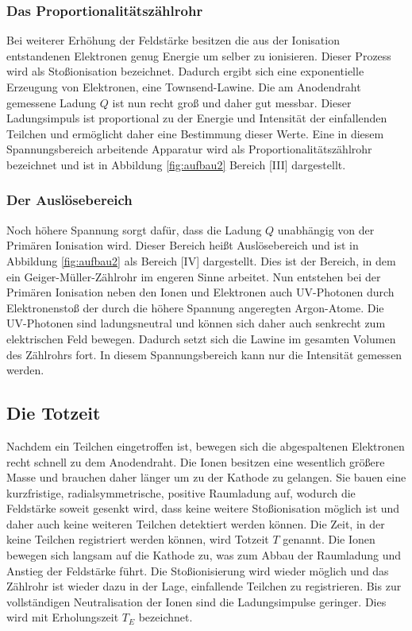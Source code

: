     \subsubsection{Das Proportionalitätszählrohr}
      Bei weiterer Erhöhung der Feldstärke besitzen die aus der Ionisation entstandenen Elektronen
      genug Energie um selber zu ionisieren. Dieser Prozess wird als Stoßionisation bezeichnet.
      Dadurch ergibt sich eine exponentielle Erzeugung von Elektronen, eine Townsend-Lawine. Die am
      Anodendraht gemessene Ladung $Q$ ist nun recht groß und daher gut messbar. Dieser Ladungsimpuls
      ist proportional zu der Energie und Intensität der einfallenden Teilchen und ermöglicht daher
      eine Bestimmung dieser Werte. Eine in diesem Spannungsbereich arbeitende Apparatur wird als
      Proportionalitätszählrohr bezeichnet und ist in Abbildung \ref{fig:aufbau2} Bereich [III]
      dargestellt.
    \subsubsection{Der Auslösebereich}
      Noch höhere Spannung sorgt dafür, dass die Ladung $Q$ unabhängig von der Primären Ionisation
      wird. Dieser Bereich heißt Auslösebereich und ist in Abbildung \ref{fig:aufbau2} als Bereich
      [IV] dargestellt. Dies ist der Bereich, in dem ein Geiger-Müller-Zählrohr im engeren Sinne
      arbeitet. Nun entstehen bei der Primären Ionisation neben den Ionen und Elektronen auch
      UV-Photonen durch Elektronenstoß der durch die höhere Spannung angeregten Argon-Atome. Die
      UV-Photonen sind ladungsneutral und können sich daher auch senkrecht zum elektrischen Feld
      bewegen. Dadurch setzt sich die Lawine im gesamten Volumen des Zählrohrs fort. In diesem
      Spannungsbereich kann nur die Intensität gemessen werden.
  \subsection{Die Totzeit}
    Nachdem ein Teilchen eingetroffen ist, bewegen sich die abgespaltenen Elektronen recht schnell zu
    dem Anodendraht. Die Ionen besitzen eine wesentlich größere Masse und brauchen daher länger um zu
    der Kathode zu gelangen. Sie bauen eine kurzfristige, radialsymmetrische, positive Raumladung auf,
    wodurch die Feldstärke soweit gesenkt wird, dass keine weitere Stoßionisation möglich ist und
    daher auch keine weiteren Teilchen detektiert werden können. Die Zeit, in der keine Teilchen
    registriert werden können, wird Totzeit $T$ genannt. Die Ionen bewegen sich langsam auf die
    Kathode zu, was zum Abbau der Raumladung und Anstieg der Feldstärke führt. Die Stoßionisierung
    wird wieder möglich und das Zählrohr ist wieder dazu in der Lage, einfallende Teilchen zu
    registrieren. Bis zur vollständigen Neutralisation der Ionen sind die Ladungsimpulse geringer.
    Dies wird mit Erholungszeit $T_{E}$ bezeichnet.
